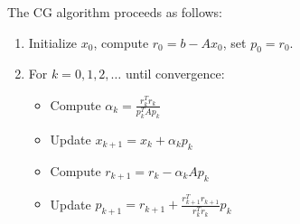 \documentclass[11pt]{article}
\begin{document}
The CG algorithm proceeds as follows:

\begin{enumerate}
  \item Initialize \( x_0 \), compute \( r_0 = b - Ax_0 \), set \( p_0 = r_0 \).
  \item For \( k = 0, 1, 2, \ldots \) until convergence:
    \begin{itemize}
      \item Compute \( \alpha_k = \frac{r_k^T r_k}{p_k^T A p_k} \)
      \item Update \( x_{k+1} = x_k + \alpha_k p_k \)
      \item Compute \( r_{k+1} = r_k - \alpha_k Ap_k \)
      \item Update \( p_{k+1} = r_{k+1} + \frac{r_{k+1}^T r_{k+1}}{r_k^T r_k} p_k \)
    \end{itemize}
\end{enumerate}
\end{document}
